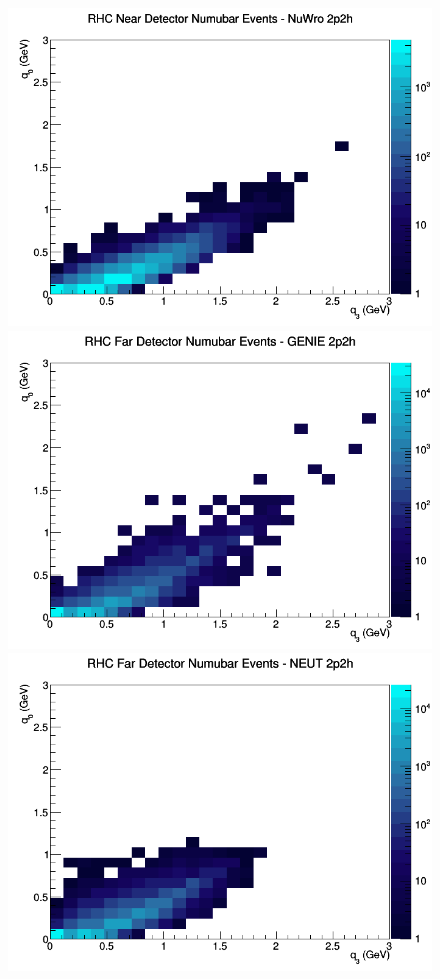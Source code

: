 \begin{figure}[h]
\includegraphics[width=\linewidth]{eff_q0_q3/LAr/2p2h_RHC_ND_numubar_q3_q0_NuWro.png}
\endminipage
\newline
{}
\includegraphics[width=\linewidth]{eff_q0_q3/LAr/2p2h_RHC_FD_numubar_q3_q0_GENIE.png}
\endminipage
{}
\includegraphics[width=\linewidth]{eff_q0_q3/LAr/2p2h_RHC_FD_numubar_q3_q0_NEUT.png}

\end{figure}
